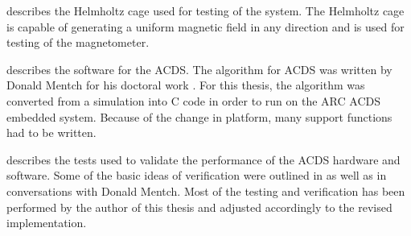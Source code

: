  describes the Helmholtz cage used for testing of the system. The Helmholtz cage is capable of generating a uniform magnetic field in any direction and is used for testing of the magnetometer.

 describes the software for the \ac{ACDS}. The algorithm for \ac{ACDS} was written by Donald Mentch for his doctoral work \cite{Mentch11}. For this thesis, the algorithm was converted from a \matlab simulation into C code in order to run on the \ac{ARC} \ac{ACDS} embedded system. Because of the change in platform, many support functions had to be written.

 describes the tests used to validate the performance of the ACDS hardware and software. Some of the basic ideas of verification were outlined in \cite{Mentch11} as well as in conversations with Donald Mentch. Most of the testing and verification has been performed by the author of this thesis and adjusted accordingly to the revised implementation.

